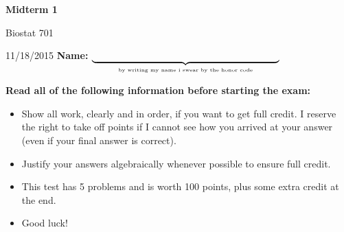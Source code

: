 \documentclass{article}
\begin{document}

\centerline{\huge \bf Midterm 1}        %
\vfill \vfill
   
Biostat 701                               %

11/18/2015 \hfill                             %
{\bf Name: } $\underbrace{\hspace{2.7in}}_{\mbox{\tiny by writing my 
                                           name i swear by the honor code}}$
\vfill \vfill \vfill

{\bf Read all of the following information before starting the exam:}
\vspace{1pc}

\begin{itemize}                        %
	\item  Show all work, clearly and in order, if you want to get full
	credit.  I reserve the right to take off points if I cannot see how you 
	arrived at your answer (even if your final answer is correct).
	
	\item Justify your answers algebraically whenever possible to ensure 
	full credit. 
		
	\item  This test has 5 problems  %
	and is worth 100 points,           %
	plus some extra credit at the end. 
	
	\item  Good luck!
\end{itemize}

\vfill \vfill \vfill

\clearpage

\end{document}
